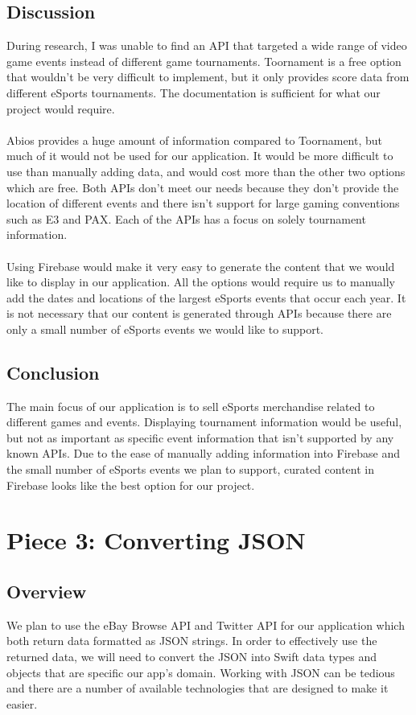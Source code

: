 \documentclass[onecolumn, draftclsnofoot,10pt, compsoc]{IEEEtran}
\begin{document}
\subsection{Discussion}
During research, I was unable to find an API that targeted a wide range of video game events instead of different game tournaments. 
Toornament is a free option that wouldn't be very difficult to implement, but it only provides score data from different eSports tournaments. 
The documentation is sufficient for what our project would require. \\ \\
\indent Abios provides a huge amount of information compared to Toornament, but much of it would not be used for our application. 
It would be more difficult to use than manually adding data, and would cost more than the other two options which are free.  
Both APIs don't meet our needs because they don't provide the location of different events and there isn't support for large gaming conventions such as E3 and PAX. 
Each of the APIs has a focus on solely tournament information. \\ \\
\indent Using Firebase would make it very easy to generate the content that we would like to display in our application.
All the options would require us to manually add the dates and locations of the largest eSports events that occur each year. 
It is not necessary that our content is generated through APIs because there are only a small number of eSports events we would like to support. 
\subsection{Conclusion}
The main focus of our application is to sell eSports merchandise related to different games and events. 
Displaying tournament information would be useful, but not as important as specific event information that isn't supported by any known APIs.
Due to the ease of manually adding information into Firebase and the small number of eSports events we plan to support, curated content in Firebase looks like the best option for our project.  

\section{Piece 3: Converting JSON}
\subsection{Overview}
We plan to use the eBay Browse API and Twitter API for our application which both return data formatted as JSON strings. 
In order to effectively use the returned data, we will need to convert the JSON into Swift data types and objects that are specific our app’s domain.
Working with JSON can be tedious and there are a number of available technologies that are designed to make it easier.
\end{document}
